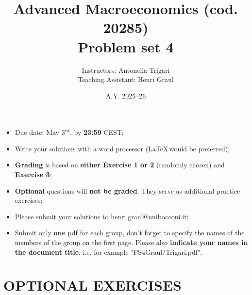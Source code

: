 \documentclass[a4paper,11pt]{article}
\begin{document}
\title{Advanced Macroeconomics (cod. 20285) \\ \textbf{Problem set 4}}

\date{A.Y. 2025--26}

\author{Instructors: Antonella Trigari\\
Teaching Assistant: Henri Graul}
\maketitle
\begin{itemize}
\item Due date: May $3^{rd}$, by \textbf{23:59} CEST;

\item Write your solutions with a word processor (\LaTeX$\,$would be preferred);

\item \textbf{Grading} is based on \textbf{either Exercise 1 or 2} (randomly chosen) and \textbf{Exercise 3};

\item \textbf{Optional} questions will \textbf{not be graded}. They serve as additional practice exercises; 

\item Please submit your solutions to \href{mailto:henri.graul@unibocconi.it}{henri.graul@unibocconi.it};

\item Submit only \textbf{one} pdf for each group, don't forget to specify the names of the members of the group on the first page. Please also \textbf{indicate your names in the document title}, i.e. for example "PS4Graul/Trigari.pdf".     
\end{itemize}

\bigskip

	


% 


\newpage


\section*{OPTIONAL EXERCISES}
\end{document}

